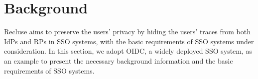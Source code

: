 \section{Background}
\label{sec:background}
Recluse aims to preserve the users' privacy by hiding the users' traces from both IdPs and RPs in SSO systems, 
with the basic requirements of SSO systems under consideration. 
In this section, we adopt OIDC, a widely deployed SSO system, as an example to present the necessary background information  and the basic requirements of SSO systems.




